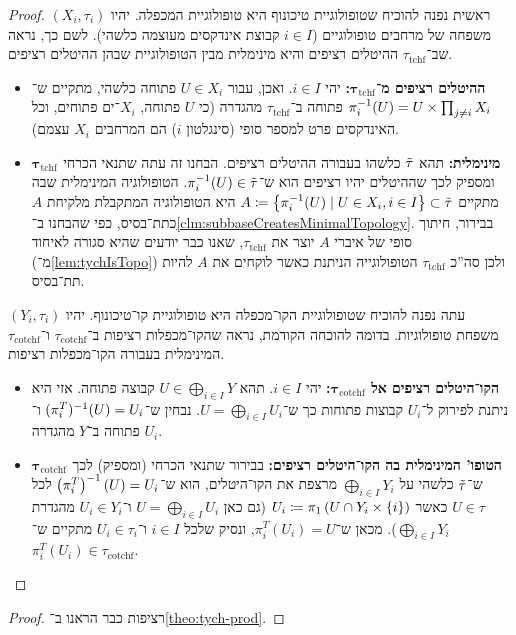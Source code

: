 \documentclass[name=רשימות טופולוגיה כללית]{../../../tex/classes/noChapterMegasumPreamble}
\newcommand\tych{\tau_{\mathrm{tchf}}}
\newcommand\cotych{\tau_{\mathrm{cotchf}}}
\begin{document}
	\begin{proof}
		ראשית נפנה להוכיח שטופולוגיית טיכונוף היא טופולוגיית המכפלה. יהיו $(X_i, \tau_i)$ משפחה של מרחבים טופולוגיים ($i \in I$ קבוצת אינדקסים מעוצמה כלשהי). לשם כך, נראה שב־$\tych$ ההיטלים רציפים והיא מינימלית מבין הטופולוגיית שבהן ההיטלים רציפים. 
		\begin{itemize}
			\item \textbf{ההיטלים רציפים מ־$\bm{\tych}$: }יהי $i \in I$. ואכן, עבור $U \in X_i$ פתוחה כלשהי, מתקיים ש־$\pi_i^{-1}(U) = U \times \prod_{j \neq i}X_i$ פתוחה ב־$\tych$ מהגדרה (כי $U$ פתוחה, $X_i$־ים פתוחים, וכל האינדקסים פרט למספר סופי (סינגלטון $i$) הם המרחבים $X_i$ עצמם). 
			\item \textbf{$\bm{\tych}$ מינימלית: }תהא $\tilde \tau$ כלשהו בעבורה ההיטלים רציפים. הבחנו זה עתה שתנאי הכרחי ומספיק לכך שההיטלים יהיו רציפים הוא ש־$\pi^{-1}_i(U) \in \tilde \tau$. הטופולוגיה המינימלית שבה מתקיים  $A \coloneqq \left \{ \pi^{-1}_i(U) \mid U \in X_i, i \in I \right \} \subset \tilde \tau$ היא הטופולוגיה המתקבלת מלקיחת $A$ כתת־בסיס, כפי שהבחנו ב־\ref{clm:subbaseCreatesMinimalTopology}. בבירור, חיתוך סופי של איברי $A$ יוצר את $\tych$, שאנו כבר יודעים שהיא סגורה לאיחוד (מ־\ref{lem:tychIsTopo}) ולכן סה''כ $\tych$ הטופולוגייה הניתנת כאשר לוקחים את $A$ להיות תת־בסיס. 
		\end{itemize}
		
		עתה נפנה להוכיח שטופולוגיית הקו־מכפלה היא טופולוגיית קו־טיכונוף. יהיו $(Y_i, \tau_i)$ משפחת טופולוגיות. בדומה להוכחה הקודמת, נראה שהקו־מכפלות רציפות ב־$\cotych$ ו־$\cotych$ המינימלית בעבורה הקו־מכפלות רציפות. 
		\begin{itemize}
			\item \textbf{הקו־היטלים רציפים אל $\bm{\cotych}$: }יהי $i \in I$. תהא $U \in \bigoplus_{i \in I}Y$ קבוצה פתוחה. אזי היא ניתנת לפירוק ל־$U_i$ קבוצות פתוחות כך ש־$U = \bigoplus_{i \in I}U_i$. נבחין ש־$(\pi_i^T)^{-1}(U) = U_i$ ו־$U_i$ פתוחה ב־$Y$ מהגדרה. 
			\item \textbf{$\bm{\cotych}$ הטופו' המינימלית בה הקו־היטלים רציפים: }בבירור שתנאי הכרחי (ומספיק) לכך ש־$\tilde \tau$ כלשהי על $\bigoplus_{i \in I}Y_i$ מרצפת את הקו־היטלים, הוא ש־$\left ( \pi_i^T \right )^{-1}(U) = U_i$ לכל $U \in \tau$ כאשר $U_i \coloneqq \pi_1\left ( U \cap Y_i \times \{i\} \right )$ (גם כאן $U = \bigoplus_{i \in I}U_i$ ו־$U_i \in Y_i$ מהגדרת $\bigoplus_{i \in I}Y_i$). מכאן ש־$\pi_i^T(U_i) = U$, ונסיק שלכל $i \in I$ ו־$U_i \in \tau_i$ מתקיים ש־$\pi_i^T(U_i) \in \cotych$. 
		\end{itemize}\envendproof
	\end{proof}
	\begin{proof}
		רציפות כבר הראנו ב־\ref{theo:tych-prod}. 
	\end{proof}
	
\end{document}
